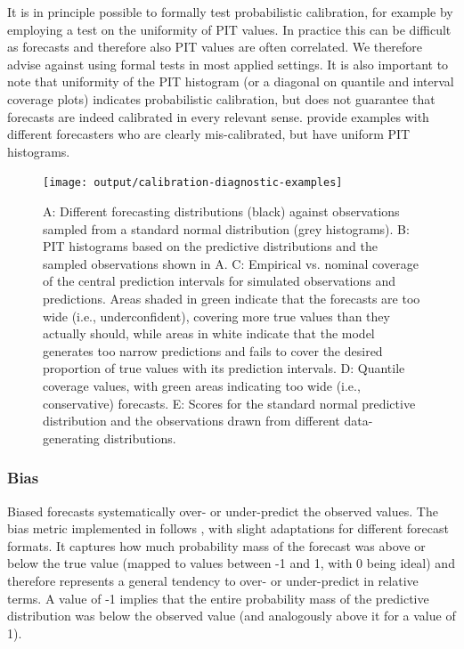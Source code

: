 \documentclass[
]{jss}
\begin{document}
It is in principle possible to formally test probabilistic calibration,
for example by employing a test on the uniformity of PIT values. In
practice this can be difficult as forecasts and therefore also PIT
values are often correlated. We therefore advise against using formal
tests in most applied settings. It is also important to note that
uniformity of the PIT histogram (or a diagonal on quantile and interval
coverage plots) indicates probabilistic calibration, but does not
guarantee that forecasts are indeed calibrated in every relevant sense.
\cite{gneitingProbabilisticForecastsCalibration2007, hamillInterpretationRankHistograms2001a}
provide examples with different forecasters who are clearly
mis-calibrated, but have uniform PIT histograms.

\begin{CodeChunk}
\begin{figure}[!h]

{\centering \texttt{[image: output/calibration-diagnostic-examples]}

}

\caption[A]{A: Different forecasting distributions (black) against observations sampled from a standard normal distribution (grey histograms). B: PIT histograms based on the predictive distributions and the sampled observations shown in A. C: Empirical vs. nominal coverage of the central prediction intervals for simulated observations and predictions. Areas shaded in green indicate that the forecasts are too wide (i.e., underconfident), covering more true values than they actually should, while areas in white indicate that the model generates too narrow predictions and fails to cover the desired proportion of true values with its prediction intervals. D: Quantile coverage values, with green areas indicating too wide (i.e., conservative) forecasts. E: Scores for the standard normal predictive distribution and the observations drawn from different data-generating distributions.}\label{fig:calibration-plots}
\end{figure}
\end{CodeChunk}

\hypertarget{bias}{%
\subsubsection{Bias}\label{bias}}

Biased forecasts systematically over- or under-predict the observed
values. The bias metric implemented in  follows
\cite{funkAssessingPerformanceRealtime2019}, with slight adaptations for
different forecast formats. It captures how much probability mass of the
forecast was above or below the true value (mapped to values between -1
and 1, with 0 being ideal) and therefore represents a general tendency
to over- or under-predict in relative terms. A value of -1 implies that
the entire probability mass of the predictive distribution was below the
observed value (and analogously above it for a value of 1).
\end{document}
